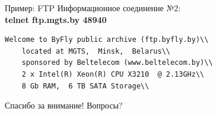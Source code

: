 \begin{frame}{Пример: FTP}
Информационное соединение №2:\\
\medskip
\scriptsize
{\bfseries telnet ftp.mgts.by 48940}\\
\begin{verbatim}
Welcome to ByFly public archive (ftp.byfly.by)\\
	located at MGTS,  Minsk,  Belarus\\
	sponsored by Beltelecom (www.beltelecom.by)\\
	2 x Intel(R) Xeon(R) CPU X3210  @ 2.13GHz\\
	8 Gb RAM,  6 TB SATA Storage\\
\end{verbatim}
\normalsize
\end{frame}


\begin{frame}{}
\Huge
\begin{center}
	Спасибо за внимание!
	\bigskip
	Вопросы?
\end{center}
\normalsize
\end{frame}



